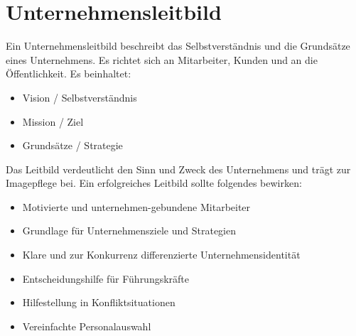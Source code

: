 \section{Unternehmensleitbild}

Ein Unternehmensleitbild beschreibt das Selbstverständnis und die Grundsätze eines Unternehmens. Es richtet sich an Mitarbeiter, Kunden und an die Öffentlichkeit. Es beinhaltet:

\begin{itemize}
    \item Vision / Selbstverständnis
    \item Mission / Ziel
    \item Grundsätze / Strategie
\end{itemize}

Das Leitbild verdeutlicht den Sinn und Zweck des Unternehmens und trägt zur Imagepflege bei. Ein erfolgreiches Leitbild sollte folgendes bewirken:

\begin{itemize}
    \item Motivierte und unternehmen-gebundene Mitarbeiter
    \item Grundlage für Unternehmensziele und Strategien
    \item Klare und zur Konkurrenz differenzierte Unternehmensidentität
    \item Entscheidungshilfe für Führungskräfte
    \item Hilfestellung in Konfliktsituationen
    \item Vereinfachte Personalauswahl
\end{itemize}